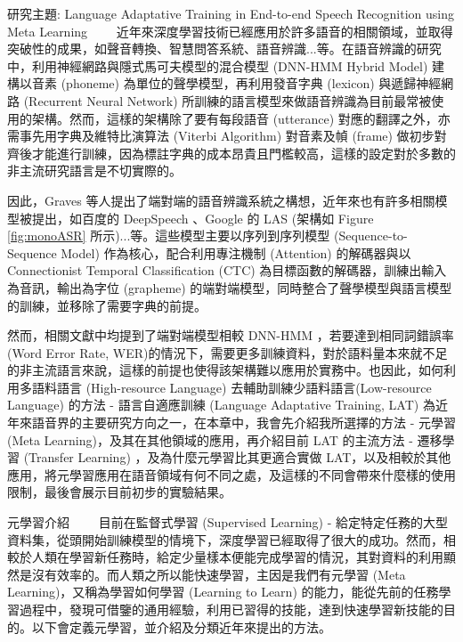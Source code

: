 \documentclass[12pt,UTF8,fntef]{article}
\begin{document}
\begin{section}{研究主題: Language Adaptative Training in End-to-end Speech Recognition using Meta Learning}
~~~~近年來深度學習技術已經應用於許多語音的相關領域，並取得突破性的成果，如聲音轉換、智慧問答系統、語音辨識...等。在語音辨識的研究中，利用神經網路與隱式馬可夫模型的混合模型 (DNN-HMM Hybrid Model) 建構以音素 (phoneme) 為單位的聲學模型，再利用發音字典 (lexicon) 與遞歸神經網路 (Recurrent Neural Network) 所訓練的語言模型來做語音辨識為目前最常被使用的架構。然而，這樣的架構除了要有每段語音 (utterance) 對應的翻譯之外，亦需事先用字典及維特比演算法 (Viterbi Algorithm) 對音素及幀 (frame) 做初步對齊後才能進行訓練，因為標註字典的成本昂貴且門檻較高，這樣的設定對於多數的非主流研究語言是不切實際的。

因此，Graves 等人提出了端對端的語音辨識系統之構想\cite{graves2014towards}，近年來也有許多相關模型被提出，如百度的 DeepSpeech \cite{hannun2014deep}、Google 的 LAS \cite{chan2016listen} (架構如 Figure \ref{fig:monoASR} 所示)...等。這些模型主要以序列到序列模型 (Sequence-to-Sequence Model) 作為核心，配合利用專注機制 (Attention) 的解碼器與以 Connectionist Temporal Classification (CTC) 為目標函數的解碼器，訓練出輸入為音訊，輸出為字位 (grapheme) 的端對端模型，同時整合了聲學模型與語言模型的訓練，並移除了需要字典的前提。

  然而，相關文獻中均提到了端對端模型相較 DNN-HMM ，若要達到相同詞錯誤率 (Word Error Rate, WER)的情況下，需要更多訓練資料，對於語料量本來就不足的非主流語言來說，這樣的前提也使得該架構難以應用於實務中。也因此，如何利用多語料語言 (High-resource Language) 去輔助訓練少語料語言(Low-resource Language) 的方法 - 語言自適應訓練 (Language Adaptative Training, LAT) 為近年來語音界的主要研究方向之一，在本章中，我會先介紹我所選擇的方法 - 元學習 (Meta Learning)，及其在其他領域的應用，再介紹目前 LAT 的主流方法 - 遷移學習 (Transfer Learning) ，及為什麼元學習比其更適合實做 LAT，以及相較於其他應用，將元學習應用在語音領域有何不同之處，及這樣的不同會帶來什麼樣的使用限制，最後會展示目前初步的實驗結果。



  \begin{subsection}{元學習介紹}
~~~~目前在監督式學習 (Supervised Learning) - 給定特定任務的大型資料集，從頭開始訓練模型的情境下，深度學習已經取得了很大的成功。然而，相較於人類在學習新任務時，給定少量樣本便能完成學習的情況，其對資料的利用顯然是沒有效率的。而人類之所以能快速學習，主因是我們有元學習 (Meta Learning)，又稱為學習如何學習 (Learning to Learn) 的能力，能從先前的任務學習過程中，發現可借鑒的通用經驗，利用已習得的技能，達到快速學習新技能的目的。以下會定義元學習，並介紹及分類近年來提出的方法。


\end{subsection}
\end{section}
\end{document}
